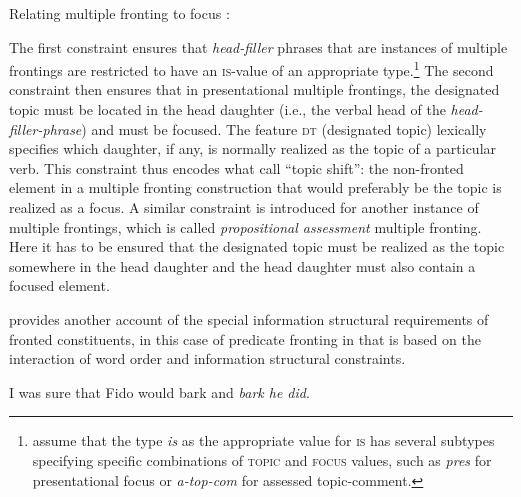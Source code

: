 \documentclass[output=paper,biblatex,babelshorthands,newtxmath,draftmode,colorlinks,citecolor=brown]{langscibook}
\begin{document}
\largerpage
\ea
\label{fig:multiplefronting}
Relating multiple fronting to focus \citep[75]{BC2010a}:\\
\impl
\flushright  {}

\medskip
\flushleft
{}
\impl 
  \medskip
\z
The first constraint ensures that \textit{head-filler} phrases that
are instances of multiple frontings are restricted to have an
\textsc{is}-value of an appropriate type.\footnote{\citet[75]{BC2010a}
  assume that the type \textit{is} as the appropriate value for
  \textsc{is} has several subtypes specifying specific combinations of
  \textsc{topic} and \textsc{focus} values, such as \textit{pres} for
  presentational focus or \textit{a-top-com} for
  assessed topic-comment.} The second constraint then ensures that in
presentational multiple frontings, the designated topic must be located in the head
daughter (i.e., the verbal head of the \pagebreak{}\textit{head-filler-phrase}) and
must be focused. The feature \textsc{dt} (designated topic) lexically specifies which
daughter, if any, is normally realized as the topic of a particular
verb. This constraint thus encodes what \citet{BC2010a} call ``topic
shift'': the non-fronted element in a multiple fronting construction
that would preferably be the topic is realized as a focus. A similar
constraint is introduced for another instance of multiple frontings,
which is called \textit{propositional assessment} multiple
fronting. Here it has to be ensured that the designated topic must be
realized as the topic somewhere in the head daughter and the
head daughter must also contain a focused element.

\citet{Webelhuth2007a-u} provides another account of the special
information structural requirements of fronted constituents, in this
case of predicate fronting in  that is based on the interaction
of word order and information structural constraints.
\begin{exe}
  \ex I was sure that Fido would bark and \textit{bark he did}.
\end{exe}
\end{document}
